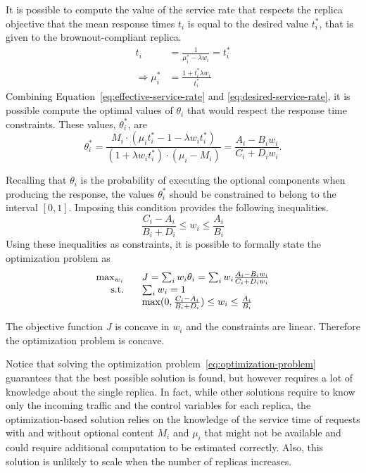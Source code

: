 It is possible to compute the value of the service rate that respects
the replica objective that the mean response times $t_i$ is equal to
the desired value $t_i^*$, that is given to the brownout-compliant
replica.
\begin{align}
  t_i & = \frac{1}{\mu_i^*-\lambda w_i} = t_i^* \\
  \Longrightarrow \mu_i^* & = \frac{1+t_i^*\lambda w_i}{t_i^*} 
  \label{eq:desired-service-rate}
\end{align}
Combining Equation~\eqref{eq:effective-service-rate} and
\eqref{eq:desired-service-rate}, it is possible compute the optimal
values of $\theta_i$ that would respect the response time
constraints. These values, $\theta_i^*$, are
\begin{equation}
  \theta_i^* = \frac{M_i \cdot \left( \mu_i t_i^* - 1 -\lambda w_i
      t_i^* \right)}{{\left( 1+\lambda w_i t_i^* \right) \cdot
      \left(\mu_i-M_i \right)}} = \frac{A_i - B_i w_i}{C_i + D_i w_i}.
  \label{eq:optimal-thetas}
\end{equation}

Recalling that $\theta_i$ is the probability of executing the optional
components when producing the response, the values $\theta_i^*$ should
be constrained to belong to the interval $[0, 1]$. Imposing this
condition provides the following inequalities.
\begin{equation}
  \frac{C_i-A_i}{B_i+D_i} \leq w_i \leq \frac{A_i}{B_i}
  \label{eq:constraints-optimal-thetas}
\end{equation}
Using these inequalities as constraints, it is possible to formally
state the optimization problem as
\begin{equation}
\begin{array}{rl}
  \max_{w_i} \;\;\; & J = \sum_i w_i \theta_i = \sum_i w_i  \frac{A_i - B_i w_i}{C_i + D_i w_i} \\
  \textnormal{s.t.} \;\;\; & \sum_i w_i = 1 \\
  & \max (0,\frac{C_i-A_i}{B_i+D_i}) \leq w_i \leq \frac{A_i}{B_i}
\end{array}
  \label{eq:optimization-problem}
\end{equation}

The objective function $J$ is concave in $w_i$ and the constraints are
linear.  Therefore the optimization problem is
concave. 

Notice that solving the optimization
problem~\eqref{eq:optimization-problem} guarantees that the best
possible solution is found, but however requires a lot of knowledge
about the single replica. In fact, while other solutions require to
know only the incoming traffic and the control variables for each
replica, the optimization-based solution relies on the knowledge of 
the service time of requests with and without optional content 
$M_i$ and $\mu_i$ that might not be available and could require 
additional computation to be estimated correctly. Also, this solution
is unlikely to scale when the number of replicas increases.
